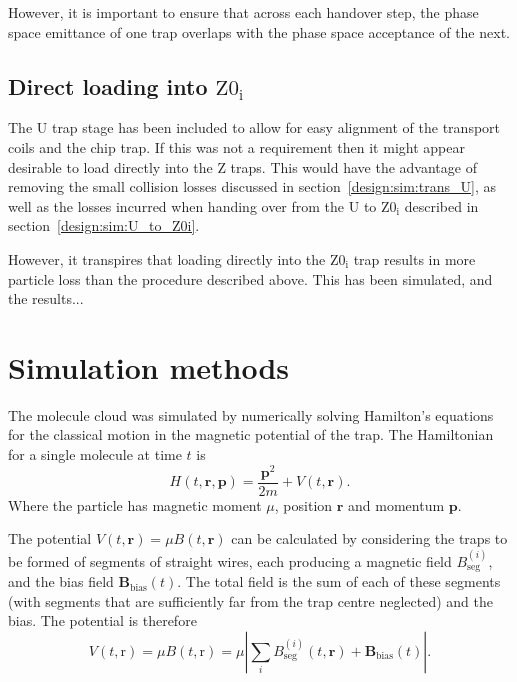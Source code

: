 However, it is important to ensure that across each handover step, the phase
space emittance of one trap overlaps with the phase space acceptance of the
next.


\subsection{Direct loading into $\mathrm{Z0_i}$}

The U trap stage has been included to allow for easy alignment of the transport
coils and the chip trap. If this was not a requirement then it might appear
desirable to load directly into the Z traps. This would have the advantage of
removing the small collision losses discussed in
section~\ref{design:sim:trans_U}, as well as the losses incurred when handing
over from the U to $\mathrm{Z0_i}$ described in
section~\ref{design:sim:U_to_Z0i}.

However, it transpires that loading directly into the $\mathrm{Z0_i}$ trap
results in more particle loss than the procedure described above. This has been
simulated, and the results...


\section{Simulation methods}
\label{design:simmethods}



The molecule cloud was simulated by numerically solving Hamilton's equations
for the classical motion in the magnetic potential of the trap. The Hamiltonian
for a single molecule at time $t$ is
%
\begin{equation}
  H(t, \mathbf{r}, \mathbf{p}) = \frac{\mathbf{p}^2}{2m} + V(t, \mathbf{r}).
\end{equation}
Where the particle has magnetic moment $\mu$, position $\mathbf{r}$ and
momentum $\mathbf{p}$.

The potential $V(t, \mathbf{r}) = \mu B(t, \mathbf{r})$ can be calculated by
considering the traps to be formed of segments of straight wires, each
producing a magnetic field $B_\text{seg}^{(i)}$, and the bias field
$\mathbf{B}_\text{bias}(t)$. The total field is the sum of each of these
segments (with segments that are sufficiently far from the trap centre
neglected) and the bias. The potential is therefore
%
\begin{equation}
  V(t, \mathrm{r}) = \mu B (t, \mathrm{r}) = \mu \left| \sum_i
  B_\text{seg}^{(i)}(t, \mathbf{r}) +
  \mathbf{B}_\text{bias}(t)\right|.
\end{equation}


